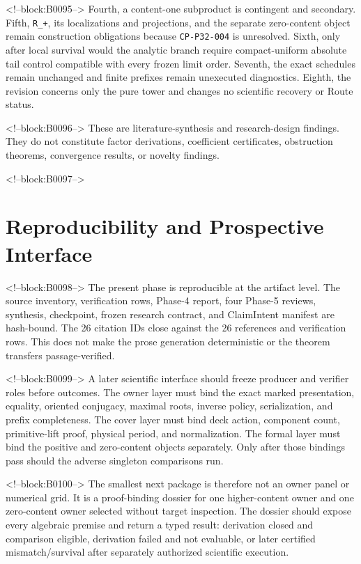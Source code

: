 \documentclass[11pt]{article}
\begin{document}
<!--block:B0095-->
Fourth, a content-one subproduct is contingent and secondary. Fifth,
\texttt{R\_+}, its localizations and projections, and the separate
zero-content object remain construction obligations because
\texttt{CP-P32-004} is unresolved. Sixth, only after local survival
would the analytic branch require compact-uniform absolute tail control
compatible with every frozen limit order. Seventh, the exact schedules
remain unchanged and finite prefixes remain unexecuted diagnostics.
Eighth, the revision concerns only the pure tower and changes no
scientific recovery or Route status.

<!--block:B0096-->
These are literature-synthesis and research-design findings. They do not
constitute factor derivations, coefficient certificates, obstruction
theorems, convergence results, or novelty findings.

<!--block:B0097-->
\hypertarget{6-reproducibility-and-prospective-interface}{%
\section{Reproducibility and Prospective
Interface}\label{6-reproducibility-and-prospective-interface}}

<!--block:B0098-->
The present phase is reproducible at the artifact level. The source
inventory, verification rows, Phase-4 report, four Phase-5 reviews,
synthesis, checkpoint, frozen research contract, and ClaimIntent manifest are
hash-bound. The 26 citation IDs close against the 26 references and
verification rows. This does not make the prose generation deterministic
or the theorem transfers passage-verified.

<!--block:B0099-->
A later scientific interface should freeze producer and verifier roles
before outcomes. The owner layer must bind the exact marked
presentation, equality, oriented conjugacy, maximal roots, inverse
policy, serialization, and prefix completeness. The cover layer must
bind deck action, component count, primitive-lift proof, physical
period, and normalization. The formal layer must bind the positive and
zero-content objects separately. Only after those bindings pass should
the adverse singleton comparisons run.

<!--block:B0100-->
The smallest next package is therefore not an owner panel or numerical
grid. It is a proof-binding dossier for one higher-content owner and one
zero-content owner selected without target inspection. The dossier
should expose every algebraic premise and return a typed result:
derivation closed and comparison eligible, derivation failed and not
evaluable, or later certified mismatch/survival after separately
authorized scientific execution.
\end{document}
